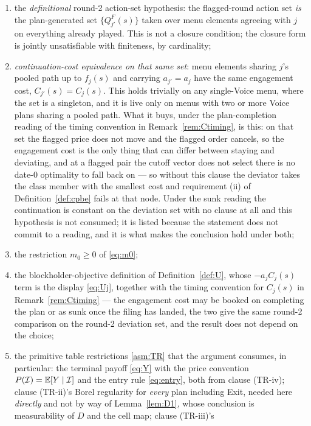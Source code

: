 \begin{proposition}
\begin{enumerate}[label=(P-\arabic*),leftmargin=3.2em,itemsep=3pt]
\item the \emph{definitional} round-2 action-set hypothesis: the flagged-round action set \emph{is}
  the plan-generated set $\{Q^F_{j'}(s)\}$ taken over menu elements agreeing with $j$ on everything
  already played. This is not a closure condition; the closure form is jointly unsatisfiable with
  finiteness, by cardinality;
\item \emph{continuation-cost equivalence on that same set}: menu elements sharing $j$'s pooled path
  up to $f_j(s)$ and carrying $a_{j'} = a_j$ have the same engagement cost, $C_{j'}(s) = C_j(s)$.
  This holds trivially on any single-Voice menu, where the set is a singleton, and it is live only on
  menus with two or more Voice plans sharing a pooled path. What it buys, under the
  plan-completion reading of the timing convention in Remark~\ref{rem:Ctiming}, is this: on that set
  the flagged price does not move and the flagged order cancels, so the engagement cost is the only
  thing that can differ between staying and deviating, and at a flagged pair the cutoff vector does
  not select there is no date-$0$ optimality to fall back on --- so without this clause the deviator
  takes the class member with the smallest cost and requirement (ii) of Definition~\ref{def:cpbe}
  fails at that node. Under the sunk reading the continuation is constant on the deviation set with
  no clause at all and this hypothesis is not consumed; it is listed because the statement does not
  commit to a reading, and it is what makes the conclusion hold under both;
\item the restriction $m_0 \ge 0$ of \eqref{eq:m0};
\item the blockholder-objective definition of Definition~\ref{def:U}, whose $-a_j C_j(s)$ term is
  the display \eqref{eq:Uj}, together with the timing convention for $C_j(s)$ in
  Remark~\ref{rem:Ctiming} --- the engagement cost may be booked on completing the plan or as sunk
  once the filing has landed, the two give the same round-2 comparison on the round-2 deviation set,
  and the result does not depend on the choice;
\item the primitive table restrictions \ref{asm:TR} that the argument consumes, in particular: the
  terminal payoff \eqref{eq:Y} with the price convention $P(\mathcal I) = \mathbb{E}[Y \mid \mathcal I]$
  and the entry rule \eqref{eq:entry}, both from clause (TR-iv); clause (TR-ii)'s Borel regularity
  for \emph{every} plan including Exit, needed here \emph{directly} and not by way of
  Lemma~\ref{lem:D1}, whose conclusion is measurability of $D$ and the cell map; clause (TR-iii)'s

\end{enumerate}
\end{proposition}
